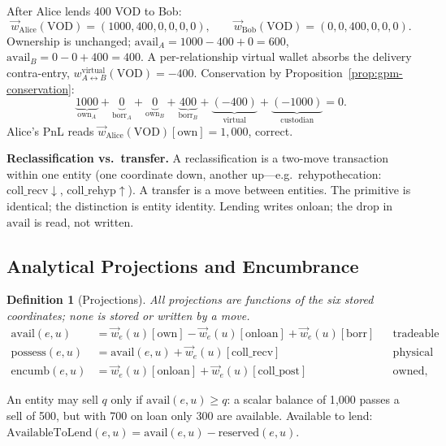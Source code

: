 \documentclass[11pt,a4paper]{article}
\newtheorem{definition}{Definition}[section]
\begin{document}
After Alice lends 400 VOD to Bob:
\[
\vec{w}_{\mathrm{Alice}}(\text{VOD}) = (1000,400,0,0,0,0),\qquad \vec{w}_{\mathrm{Bob}}(\text{VOD}) = (0,0,400,0,0,0).
\]
Ownership is unchanged; $\mathrm{avail}_A = 1000-400+0 = 600$, $\mathrm{avail}_B = 0-0+400 = 400$. A per-relationship virtual wallet absorbs the delivery contra-entry, $w^{\mathrm{virtual}}_{A\leftrightarrow B}(\text{VOD}) = -400$. Conservation by Proposition~\ref{prop:gpm-conservation}:
\[
\underbrace{1000}_{\mathrm{own}_A} + \underbrace{0}_{\mathrm{borr}_A} + \underbrace{0}_{\mathrm{own}_B} + \underbrace{400}_{\mathrm{borr}_B} + \underbrace{(-400)}_{\text{virtual}} + \underbrace{(-1000)}_{\text{custodian}} = 0.
\]
Alice's PnL reads $\vec{w}_{\mathrm{Alice}}(\text{VOD})[\mathrm{own}] = 1{,}000$, correct.

\noindent\textbf{Reclassification vs.\ transfer.} A reclassification is a two-move transaction within one entity (one coordinate down, another up---e.g.\ rehypothecation: $\mathrm{coll\_recv}\downarrow$, $\mathrm{coll\_rehyp}\uparrow$). A transfer is a move between entities. The primitive is identical; the distinction is entity identity. Lending writes $\mathrm{onloan}$; the drop in $\mathrm{avail}$ is read, not written.

\subsection{Analytical Projections and Encumbrance}
\label{sec:projections}

\begin{definition}[Projections]
\label{def:projections}
All projections are functions of the six stored coordinates; none is stored or written by a move.
\begin{align*}
\mathrm{avail}(e,u)   &= \vec{w}_e(u)[\mathrm{own}] - \vec{w}_e(u)[\mathrm{onloan}] + \vec{w}_e(u)[\mathrm{borr}] && \text{tradeable inventory}\\
\mathrm{possess}(e,u) &= \mathrm{avail}(e,u) + \vec{w}_e(u)[\mathrm{coll\_recv}] && \text{physical custody}\\
\mathrm{encumb}(e,u)  &= \vec{w}_e(u)[\mathrm{onloan}] + \vec{w}_e(u)[\mathrm{coll\_post}] && \text{owned, not tradeable}
\end{align*}
\end{definition}

\noindent An entity may sell $q$ only if $\mathrm{avail}(e,u) \geq q$: a scalar balance of 1{,}000 passes a sell of 500, but with 700 on loan only 300 are available. Available to lend: $\text{AvailableToLend}(e,u) = \mathrm{avail}(e,u) - \mathrm{reserved}(e,u)$.
\end{document}
